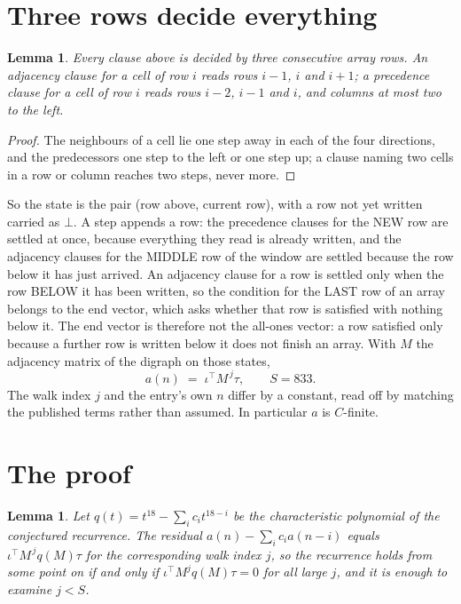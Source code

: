 \documentclass[11pt,a4paper]{article}
\theoremstyle{plain}
\newtheorem{lemma}[theorem]{Lemma}
\theoremstyle{definition}
\begin{document}
\section{Three rows decide everything}

\begin{lemma}\label{lem:win}
Every clause above is decided by three consecutive array rows. An adjacency clause for a cell
of row $i$ reads rows $i-1$, $i$ and $i+1$; a precedence clause for a cell of row $i$ reads
rows $i-2$, $i-1$ and $i$, and columns at most two to the left.
\end{lemma}

\begin{proof}
The neighbours of a cell lie one step away in each of the four directions, and the predecessors
one step to the left or one step up; a clause naming two cells in a row or column reaches two
steps, never more.
\end{proof}

So the state is the pair (row above, current row), with a row not yet written carried as
$\bot$. A step appends a row: the precedence clauses for the NEW row are settled at once,
because everything they read is already written, and the adjacency clauses for the MIDDLE row
of the window are settled because the row below it has just arrived. An adjacency clause for a row is settled only when the row BELOW it has been
written, so the condition for the LAST row of an array belongs to the end vector, which asks
whether that row is satisfied with nothing below it. The end vector is therefore not the
all-ones vector: a row satisfied only because a further row is written below it does not
finish an array. With $M$ the
adjacency matrix of the digraph on those states,
\[
a(n)\;=\;\iota^{\!\top}M^{\,j}\tau ,\qquad S=833.
\]
The walk index $j$ and the entry's own $n$ differ by a constant, read off by matching the
published terms rather than assumed. In particular $a$ is $C$-finite.

\section{The proof}

\begin{lemma}\label{lem:crit}
Let $q(t)=t^{18}-\sum_i c_it^{18-i}$ be the characteristic polynomial of the
conjectured recurrence. The residual $a(n)-\sum_ic_ia(n-i)$ equals
$\iota^{\!\top}M^{\,j}q(M)\tau$ for the corresponding walk index $j$, so the recurrence
holds from some point on if and only if $\iota^{\!\top}M^{j}q(M)\tau=0$ for all large $j$,
and it is enough to examine $j<S$.
\end{lemma}
\end{document}
